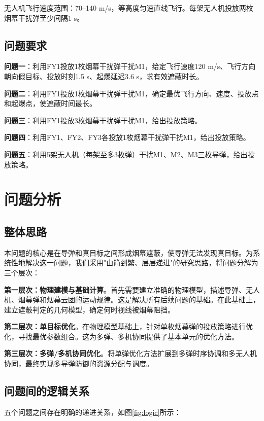\documentclass[12pt,a4paper]{article}
\begin{document}
无人机飞行速度范围：70--140 m/s，等高度匀速直线飞行。每架无人机投放两枚烟幕干扰弹至少间隔1 s。

\subsection{问题要求}

\textbf{问题一}：利用FY1投放1枚烟幕干扰弹干扰M1，给定飞行速度120 m/s、飞行方向朝向假目标、投放时刻1.5 s、起爆延迟3.6 s，求有效遮蔽时长。

\textbf{问题二}：利用FY1投放1枚烟幕干扰弹干扰M1，确定最优飞行方向、速度、投放点和起爆点，使遮蔽时间最长。

\textbf{问题三}：利用FY1投放3枚烟幕干扰弹干扰M1，给出投放策略。

\textbf{问题四}：利用FY1、FY2、FY3各投放1枚烟幕干扰弹干扰M1，给出投放策略。

\textbf{问题五}：利用5架无人机（每架至多3枚弹）干扰M1、M2、M3三枚导弹，给出投放策略。

\section{问题分析}

\subsection{整体思路}

本问题的核心是在导弹和真目标之间形成烟幕遮蔽，使导弹无法发现真目标。为系统性地解决这一问题，我们采用"由简到繁、层层递进"的研究思路，将问题分解为三个层次：

\textbf{第一层次：物理建模与基础计算}。首先需要建立准确的物理模型，描述导弹、无人机、烟幕弹和烟幕云团的运动规律。这是解决所有后续问题的基础。在此基础上，建立遮蔽判定的几何模型，确定何时视线被烟幕阻挡。

\textbf{第二层次：单目标优化}。在物理模型基础上，针对单枚烟幕弹的投放策略进行优化，寻找最优参数组合。这为多弹、多机协同提供了基本单元的优化方法。

\textbf{第三层次：多弹/多机协同优化}。将单弹优化方法扩展到多弹时序协调和多无人机协同，最终实现多导弹防御的资源分配与调度。

\subsection{问题间的逻辑关系}

五个问题之间存在明确的递进关系，如图\ref{fig:logic}所示：
\end{document}
